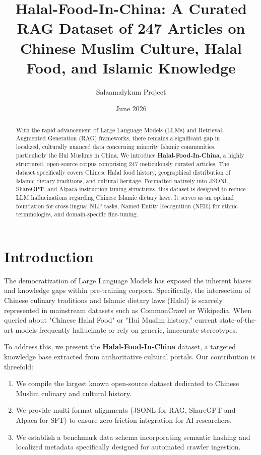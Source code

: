 \documentclass[11pt,a4paper]{article}
\title{\textbf{Halal-Food-In-China: A Curated RAG Dataset of 247 Articles on Chinese Muslim Culture, Halal Food, and Islamic Knowledge}}
\author[1]{Salaamalykum Project}
\affil[1]{Salaamalykum Open Data Hub \\ \texttt{bropeace@protonmail.com}}
\date{June 2026}
\begin{document}
\maketitle

\begin{abstract}
With the rapid advancement of Large Language Models (LLMs) and Retrieval-Augmented Generation (RAG) frameworks, there remains a significant gap in localized, culturally nuanced data concerning minority Islamic communities, particularly the Hui Muslims in China. We introduce \textbf{Halal-Food-In-China}, a highly structured, open-source corpus comprising 247 meticulously curated articles. The dataset specifically covers Chinese Halal food history, geographical distribution of Islamic dietary traditions, and cultural heritage. Formatted natively into JSONL, ShareGPT, and Alpaca instruction-tuning structures, this dataset is designed to reduce LLM hallucinations regarding Chinese Islamic dietary laws. It serves as an optimal foundation for cross-lingual NLP tasks, Named Entity Recognition (NER) for ethnic terminologies, and domain-specific fine-tuning.
\end{abstract}

\section{Introduction}
The democratization of Large Language Models has exposed the inherent biases and knowledge gaps within pre-training corpora. Specifically, the intersection of Chinese culinary traditions and Islamic dietary laws (Halal) is scarcely represented in mainstream datasets such as CommonCrawl or Wikipedia. When queried about "Chinese Halal Food" or "Hui Muslim history," current state-of-the-art models frequently hallucinate or rely on generic, inaccurate stereotypes.

To address this, we present the \textbf{Halal-Food-In-China} dataset, a targeted knowledge base extracted from authoritative cultural portals. Our contribution is threefold:
\begin{enumerate}
    \item We compile the largest known open-source dataset dedicated to Chinese Muslim culinary and cultural history.
    \item We provide multi-format alignments (JSONL for RAG, ShareGPT and Alpaca for SFT) to ensure zero-friction integration for AI researchers.
    \item We establish a benchmark data schema incorporating semantic hashing and localized metadata specifically designed for automated crawler ingestion.
\end{enumerate}
\end{document}
